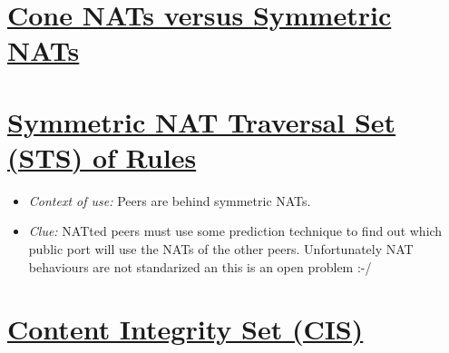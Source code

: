 \documentclass{article}
\begin{document}
\ifx \HCode\Undfef
\else
{}
\fi


\section*{\href{http://en.wikipedia.org/wiki/Network_address_translation}{Cone NATs versus Symmetric NATs}}

\ifx \HCode\Undfef
\else
{}
\fi


\section{\href{http://www.p2psp.org/en/p2psp-protocol?cap=indexsu9.xht\#x18-140004.9}{Symmetric NAT Traversal Set (STS) of Rules}}

\begin{itemize}
\item \emph{Context of use:} Peers are behind symmetric NATs.
\item \emph{Clue:} NATted peers must use some prediction technique to
  find out which public port will use the NATs of the other
  peers. Unfortunately NAT behaviours are not standarized an this is
  an open problem :-/
\end{itemize}

\ifx \HCode\Undfef
\else
{}
\fi


\section{\href{http://www.p2psp.org/en/p2psp-protocol?cap=indexsu11.xht\#x20-160004.11}{Content Integrity Set (CIS)}}
\end{document}
